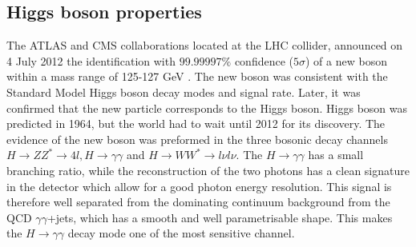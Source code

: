 \subsection{Higgs boson properties}
\label{chap1:H2012:HM}
The ATLAS and CMS collaborations located at the LHC collider, announced on 4 July 2012 the identification with $99.99997\%$ confidence ($5\sigma$) of a new boson within a mass range of 125-127 GeV \cite{ATLAS_2012, CMS_2012}. The new boson was consistent with the Standard Model Higgs boson decay modes and signal rate. Later, it was confirmed that the new particle corresponds to the Higgs boson. Higgs boson was predicted in 1964, but the world had to wait until 2012 for its discovery. The evidence of the new boson was preformed in the three bosonic decay channels $H\rightarrow ZZ^* \rightarrow 4l, H\rightarrow\gamma\gamma$ and $H\rightarrow WW^*\rightarrow l\nu l\nu$. The $H\rightarrow\gamma\gamma$ has a small branching ratio, while the reconstruction of the two photons has a clean signature in the detector which allow for a good photon energy resolution. This signal is therefore well separated from the dominating continuum background from the QCD $\gamma\gamma$+jets, which has a smooth and well parametrisable shape. This makes the $H\rightarrow\gamma\gamma$ decay mode one of the most sensitive channel. \\

